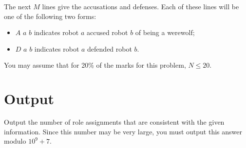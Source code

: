 The next $M$ lines give the accusations and defenses. Each of these lines will be one of the following two forms:

\begin{itemize}
\item $A$ $a$ $b$ indicates robot $a$ accused robot $b$ of being a werewolf;
\item $D$ $a$ $b$ indicates robot $a$ defended robot $b$.
\end{itemize}

You may assume that for 20\% of the marks for this problem, $N \leq 20$.

\section*{Output}
Output the number of role assignments that are consistent with the given information. Since this number may be very large, you must output this answer modulo $10^9 + 7$.